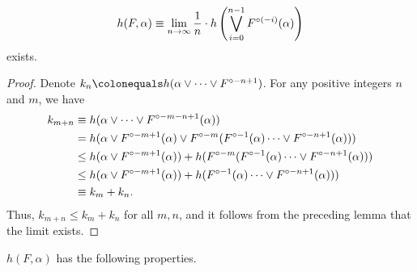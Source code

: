 \documentclass[12pt,twoside,draft]{book}
\begin{document}
\begin{proposition}
  \begin{equation*}
    h(F,\alpha) \equiv \lim\limits_{n \to \infty} \frac{1}{n} \cdot h\left (  \bigvee\limits_{i=0}^{n-1} F^{\circ (-i)}(\alpha)  \right )
  \end{equation*}
  exists.
  \label{prop:entropy-limit}
  \begin{proof}
    Denote $k_n \ceq h(\alpha \vee \cdots \vee \itr{F}{-n+1})$.
    For any positive integers $n$ and $m$, we have
    \begin{align*}
      k_{m+n} &\equiv h(\alpha \vee \cdots \vee F^{\circ -m-n+1}(\alpha))   \\
      &= h(\alpha \vee F^{\circ -m+1}(\alpha) \vee F^{\circ -m}(F^{\circ -1}(\alpha) \cdots \vee F^{\circ -n+1}(\alpha)))   \\
      &\leq  h(\alpha \vee F^{\circ -m+1}(\alpha)) + h(F^{\circ -m}(F^{\circ -1}(\alpha) \cdots \vee F^{\circ -n+1}(\alpha)))   \\
      &\leq  h(\alpha \vee F^{\circ -m+1}(\alpha)) + h(F^{\circ -1}(\alpha) \cdots \vee F^{\circ -n+1}(\alpha)))   \\
      &\equiv k_m + k_n.
    \end{align*}
    Thus, $k_{m+n} \leq k_m + k_n$ for all $m,n$, and it follows from the preceding lemma that the limit exists.
  \end{proof}
\end{proposition}
$h(F, \alpha)$ has the following properties.
\end{document}
